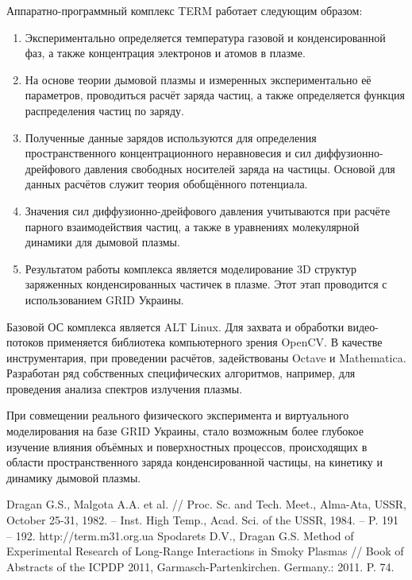 \documentclass[10pt, a5paper]{article}
\begin{document}
Аппаратно-программный комплекс TERM работает следующим образом:
\begin{enumerate}
	\item Экспериментально определяется температура газовой и конденсированной фаз, а также концентрация электронов и атомов в плазме.
	\item На основе теории дымовой плазмы и измеренных экспериментально её параметров, проводиться расчёт заряда частиц, а также определяется функция распределения частиц по заряду.
	\item Полученные данные зарядов используются для определения пространственного концентрационного неравновесия и сил диффузионно-дрейфового давления свободных носителей заряда на частицы. Основой для данных расчётов служит теория обобщённого потенциала.
	\item Значения сил диффузионно-дрейфового давления учитываются при  расчёте парного взаимодействия частиц, а также в уравнениях молекулярной динамики для дымовой плазмы.
	\item Результатом работы комплекса является моделирование 3D структур заряженных конденсированных частичек в плазме. Этот этап проводится с использованием GRID Украины.
\end{enumerate}
Базовой ОС комплекса является ALT Linux. Для захвата и обработки видео-потоков применяется библиотека компьютерного зрения OpenCV. В качестве инструментария, при проведении расчётов, задействованы Octave и Mathematica. Разработан ряд собственных специфических алгоритмов, например, для проведения анализа спектров излучения плазмы. 

При совмещении реального физического эксперимента и виртуального моделирования на базе GRID Украины, стало возможным более глубокое изучение влияния объёмных и поверхностных процессов, происходящих в области пространственного заряда конденсированной частицы, на кинетику и динамику дымовой плазмы.
\begin{thebibliography}{9}
	Dragan G.S., Malgota A.A. et al. // Proc. Sc. and Tech. Meet., Alma-Ata, USSR, October 25-31, 1982. – Inst. High Temp., Acad. Sci. of the USSR, 1984. – P. 191 – 192. 
	 http://term.m31.org.ua
	 Spodarets D.V., Dragan G.S. Method of Experimental Research of Long-Range Interactions in Smoky Plasmas // Book of Abstracts of the ICPDP 2011, Garmasch-Partenkirchen. Germany.: 2011. P. 74. 
\end{thebibliography}
\end{document}
